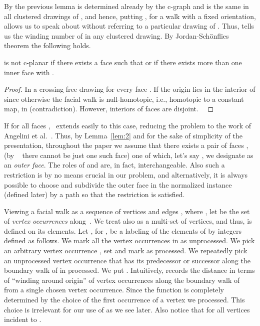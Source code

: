 \documentclass{llncs}
\def\qed{ \ \vrule width.2cm height.2cm depth0cm\smallskip}
\begin{document}
 
By the previous lemma  is determined already by the c-graph  and is the same in all  clustered drawings of , and hence, putting , for a walk  with a fixed orientation, allows us to speak about  without
referring to a particular drawing of .
 Thus,  tells us the winding number of  in any clustered 
drawing.
By Jordan-Sch\"onflies theorem  the following holds. 

\begin{lemma}
\label{lem:2}
 is not c-planar if there exists a face  such that  or if there exists more than one inner face  with .
\end{lemma}
\begin{proof}
In a crossing free drawing   for every face .
If  the origin  lies in the interior of  since
otherwise the facial walk is null-homotopic, i.e., homotopic to a constant map, in  (contradiction). However, interiors of faces are disjoint.
\qed\end{proof}
 If  for all faces ,~\cite[Lemma 1.2]{F14+} extends easily to this case,
reducing the problem to the work of Angelini et al.~\cite{ADDF13}.
Thus, by Lemma~\ref{lem:2} and for the sake of simplicity of the presentation, throughout the paper we assume that there exists a pair  of faces ,   (by
~ there cannot be just one such face) one of which, let's say ,
we designate as an \emph{outer face}.  The roles of  and  are, in fact, interchangeable.
Also such a restriction is by no means crucial in our problem, and alternatively, it is always possible
to choose and subdivide the outer face in the normalized instance (defined later) by a path so that the restriction is satisfied.


Viewing a facial walk  as a sequence of vertices and edges , where ,
let  be the set  of \emph{vertex occurrences} along~.
We treat  also as a multi-set of vertices, and thus,  is defined on its elements.
Let , for , be a labeling of the elements of  by integers defined as follows.
We mark all the vertex occurrences  in  as unprocessed.
We pick an arbitrary vertex occurrence  , set 
and mark  as processed.
We repeatedly pick an unprocessed vertex occurrence   that has its predecessor or successor  along the boundary walk of  in   processed.
 We put  .
 Intuitively,  records 
 the distance  in terms of ``winding around origin'' of vertex occurrences 
 along the boundary walk of  from a single chosen vertex occurrence.
 Since  the function   is completely determined by
the choice of the  first occurrence of a vertex we processed. 
This choice is irrelevant for our use of  as we see later.
Also notice that  for all vertices incident to .
\end{document}
